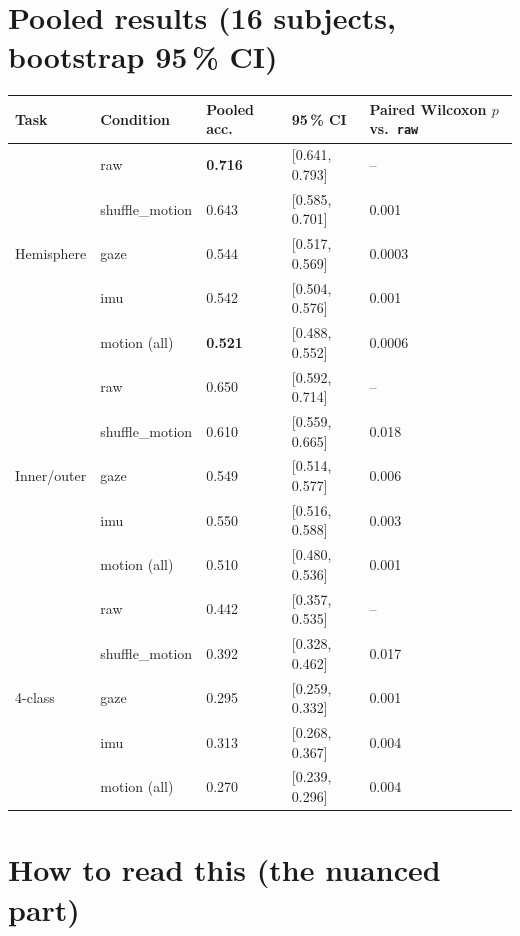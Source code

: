 \section{Pooled results (16 subjects, bootstrap 95\,\% CI)}

\begin{table}[ht]
\centering
\begin{tabular}{lllll}
\toprule
Task & Condition & Pooled acc.\ & 95\,\% CI & Paired Wilcoxon $p$ vs.\ \texttt{raw} \\
\midrule
\multirow{5}{*}{Hemisphere}
& raw            & \textbf{0.716} & [0.641, 0.793] & -- \\
& shuffle\_motion & 0.643 & [0.585, 0.701] & 0.001 \\
& gaze           & 0.544 & [0.517, 0.569] & 0.0003 \\
& imu            & 0.542 & [0.504, 0.576] & 0.001 \\
& motion (all)   & \textbf{0.521} & [0.488, 0.552] & 0.0006 \\
\midrule
\multirow{5}{*}{Inner/outer}
& raw            & 0.650 & [0.592, 0.714] & -- \\
& shuffle\_motion & 0.610 & [0.559, 0.665] & 0.018 \\
& gaze           & 0.549 & [0.514, 0.577] & 0.006 \\
& imu            & 0.550 & [0.516, 0.588] & 0.003 \\
& motion (all)   & 0.510 & [0.480, 0.536] & 0.001 \\
\midrule
\multirow{5}{*}{4-class}
& raw            & 0.442 & [0.357, 0.535] & -- \\
& shuffle\_motion & 0.392 & [0.328, 0.462] & 0.017 \\
& gaze           & 0.295 & [0.259, 0.332] & 0.001 \\
& imu            & 0.313 & [0.268, 0.367] & 0.004 \\
& motion (all)   & 0.270 & [0.239, 0.296] & 0.004 \\
\bottomrule
\end{tabular}
\end{table}

\section{How to read this (the nuanced part)}

